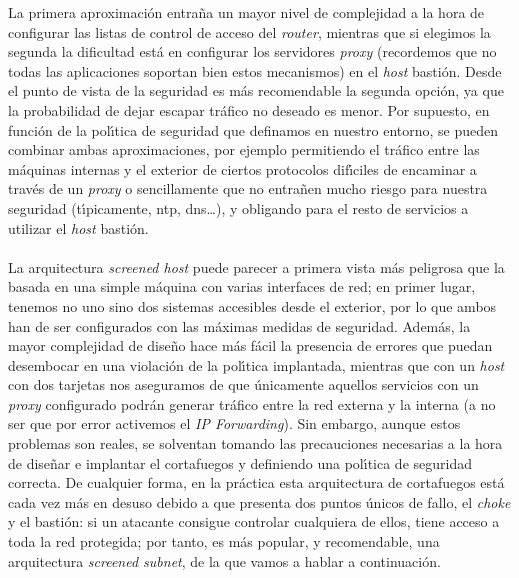 La primera aproximaci\'on entra\~na un mayor nivel de complejidad a la hora de
configurar las listas de control de acceso del {\it router}, mientras que si
elegimos la segunda la dificultad est\'a en configurar los servidores {\it 
proxy} (recordemos que no todas las aplicaciones soportan bien estos 
mecanismos) en el {\it host} basti\'on. Desde el punto de vista de la seguridad
es m\'as recomendable la segunda opci\'on, ya que la probabilidad de dejar
escapar tr\'afico no deseado es menor. Por supuesto, en funci\'on de la 
pol\'{\i}tica de seguridad que definamos en nuestro entorno, se pueden combinar
ambas aproximaciones, por ejemplo permitiendo el tr\'afico entre las m\'aquinas
internas y el exterior de ciertos protocolos dif\'{\i}ciles de encaminar a 
trav\'es de un {\it proxy} o sencillamente que no entra\~nen mucho riesgo para
nuestra seguridad (t\'{\i}picamente, {\sc ntp}, {\sc dns}\ldots), y obligando 
para el resto de servicios a utilizar el {\it host} basti\'on.\\
\\La arquitectura {\it screened host} puede parecer a primera vista m\'as
peligrosa que la basada en una simple m\'aquina con varias interfaces de red;
en primer lugar, tenemos no uno sino dos sistemas accesibles desde el exterior,
por lo que ambos han de ser configurados con las m\'aximas medidas de 
seguridad. Adem\'as, la mayor complejidad de dise\~no hace m\'as f\'acil la
presencia de errores que puedan desembocar en una violaci\'on de la 
pol\'{\i}tica implantada, mientras que con un {\it host} con dos tarjetas nos
aseguramos de que \'unicamente aquellos servicios con un {\it proxy} configurado
podr\'an generar tr\'afico entre la red externa y la interna (a no ser que
por error activemos el {\it IP Forwarding}). Sin embargo, aunque estos problemas
son reales, se solventan tomando las precauciones necesarias a la hora de 
dise\~nar e implantar el cortafuegos y definiendo una pol\'{\i}tica de seguridad
correcta. De cualquier forma, en la pr\'actica esta arquitectura de cortafuegos 
est\'a cada vez m\'as en desuso debido a que presenta dos puntos \'unicos de
fallo, el {\it choke} y el basti\'on: si un atacante consigue controlar 
cualquiera de ellos, tiene acceso a toda la red protegida; por tanto, es m\'as
popular, y recomendable, una arquitectura {\it screened subnet}, de la que
vamos a hablar a continuaci\'on.
